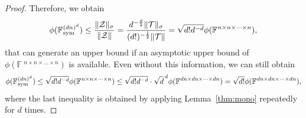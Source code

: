 \documentclass[11pt]{article}
\newcommand{\R}{\mathbb{R}}
\newcommand{\BF}{\mathbb{F}\:\!}
\newcommand{\Z}{\mathcal{Z}}
\newcommand{\TT}{\mathcal{T}}
\newcommand{\F}{\mathcal{F}}
\newcommand{\A}{\mathcal{A}}
\newcommand{\bx}{\boldsymbol{x}}
\newcommand{\by}{\boldsymbol{y}}
\newcommand{\bz}{\boldsymbol{z}}
\newcommand{\sym}{\textnormal{sym}}
\begin{document}
\begin{proof}
Therefore, we obtain
\begin{equation}\label{eq:symupper}
   \phi(\BF^{(dn)^d}_\sym) \le \frac{\|\Z\|_\sigma}{\|\Z\|} = \frac{d^{-\frac{d}{2}}\|\TT\|_\sigma}{(d!)^{-\frac{1}{2}}\|\TT\|} =  \sqrt{d!d^{-d}}\phi(\BF^{n\times n\times \dots \times n}),
\end{equation}
that can generate an upper bound if an asymptotic upper bound of $\phi(\BF^{n\times n\times \dots \times n})$ is available. Even without this information, we can still obtain
$$
   \phi(\BF^{(dn)^d}_\sym) \le \sqrt{d!d^{-d}}\phi(\BF^{n\times n\times \dots \times n}) \le \sqrt{d!d^{-d}}\cdot \sqrt{d}^{\,d} \phi(\BF^{dn\times dn \times \dots \times dn}) = \sqrt{d!} \phi(\BF^{dn\times dn \times \dots \times dn}),
$$
where the last inequality is obtained by applying Lemma~\ref{thm:mono} repeatedly for $d$ times.
\end{proof}


\end{document}
